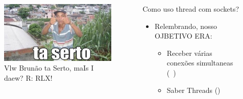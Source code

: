 \documentclass[10pt, xcolor=x11names]{beamer}
\begin{document}
\begin{frame}
	\begin{columns}
			\begin{figure}
				\includegraphics[width=.8\linewidth]{img/taserto.png}
				\caption{Vlw Brunão ta Serto, maIs I daew? R: RLX!}
			\end{figure}
		

		\begin{block}{Como uso thread com sockets?}
			\begin{itemize}
				\item Relembrando, nosso OJBETIVO ERA:
					\begin{itemize}
						\item Receber várias conexões simultaneas (~)
						\item Saber Threads (\checkmark)
					\end{itemize}
			\end{itemize}
		\end{block}
		
	\end{columns}
\end{frame}

\end{document}
